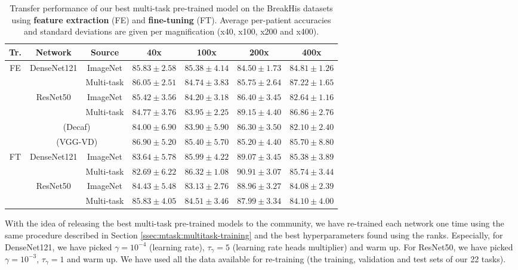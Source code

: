 \begin{table}
    \centering
    \small
    \begin{tabular}{|c|c|c|cccc|}
        \hline
        Tr. & Network & Source & 40x & 100x & 200x & 400x \\
        \hline
\multirow{6}{*}{FE} & \multirow{2}{*}{DenseNet121} & ImageNet & $85.83 \pm 2.58$ & $85.38 \pm 4.14$ & $84.50 \pm 1.73$ & $84.81 \pm 1.26$\\
& & Multi-task & $86.05 \pm 2.51$ & $84.74 \pm 3.83$ & $85.75 \pm 2.64$ & $87.22 \pm 1.65$\\
\cline{2-7}
& \multirow{2}{*}{ResNet50} & ImageNet & $85.42 \pm 3.56$ & $84.20 \pm 3.18$ & $86.40 \pm 3.45$ & $82.64 \pm 1.16$\\
& & Multi-task & $84.77 \pm 3.76$ & $83.95 \pm 2.25$ & $89.15 \pm 4.40$ & $86.86 \pm 2.76$\\
\cline{2-7}
&  \multicolumn{2}{c|}{\cite{spanhol2017deep} (Decaf)} &  $84.00 \pm 6.90 $ & $83.90  \pm 5.90$ & $86.30 \pm 3.50$ & $82.10 \pm 2.40$ \\
& \multicolumn{2}{c|}{\cite{song2017supervised} (VGG-VD)} & $86.90 \pm 5.20$ & $85.40 \pm 5.70$ & $85.20 \pm 4.40$ & $85.70 \pm 8.80$ \\
\hline
\multirow{4}{*}{FT} & \multirow{2}{*}{DenseNet121} & ImageNet & $83.64 \pm 5.78$ & $85.99 \pm 4.22$ & $89.07 \pm 3.45$ & $85.38 \pm 3.89$\\
& & Multi-task & $82.69 \pm 6.22$ & $86.32 \pm 1.08$ & $90.91 \pm 3.07$ & $85.74 \pm 3.44$\\
\cline{2-7}
& \multirow{2}{*}{ResNet50} & ImageNet & $84.43 \pm 5.48$ & $83.13 \pm 2.76$ & $88.96 \pm 3.27$ & $84.08 \pm 2.39$\\
& & Multi-task & $85.83 \pm 4.05$ & $84.51 \pm 3.46$ & $87.99 \pm 3.34$ & $84.10 \pm 4.00$\\
        \hline
    \end{tabular}
    \caption{Transfer performance of our best multi-task pre-trained model on the BreakHis datasets using \textbf{feature extraction} (FE) and \textbf{fine-tuning} (FT). Average per-patient accuracies and standard deviations are given per magnification (x40, x100, x200 and x400).}
    \label{tab:mtask:breakhis_eval}
\end{table}

With the idea of releasing the best multi-task pre-trained models to the community, we have re-trained each network one time using the same procedure described in Section \ref{ssec:mtask:multitask-training} and the best hyperparameters found using the ranks. Especially, for DenseNet121, we have picked $\gamma = 10^{-4}$ (learning rate), $\tau_\gamma = 5$ (learning rate heads multiplier) and warm up. For ResNet50, we have picked $\gamma = 10^{-3}$, $\tau_\gamma = 1$ and warm up. We have used all the data available for re-training (\ie the training, validation and test sets of our 22 tasks).

